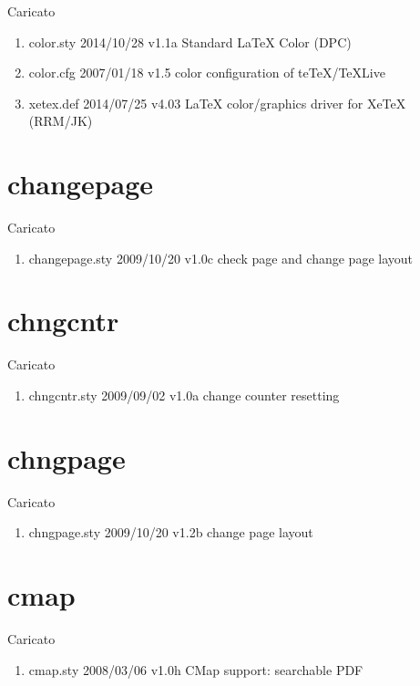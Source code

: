 Caricato 
\begin{enumerate}
	 \item color.sty    2014/10/28 v1.1a Standard LaTeX Color (DPC)
	 \item color.cfg    2007/01/18 v1.5 color configuration of teTeX/TeXLive
	 \item xetex.def    2014/07/25 v4.03 LaTeX color/graphics driver for XeTeX (RRM/JK)
\end{enumerate}

\section{changepage}

Caricato 
\begin{enumerate}
\item changepage.sty 2009/10/20 v1.0c check page and change page layout
\end{enumerate}
\section{chngcntr}

Caricato 
\begin{enumerate}
\item chngcntr.sty 2009/09/02 v1.0a change counter resetting
\end{enumerate}
\section{chngpage}

Caricato 
\begin{enumerate}
\item chngpage.sty 2009/10/20 v1.2b change page layout
\end{enumerate}
\section{cmap}

Caricato 
\begin{enumerate}
\item cmap.sty 2008/03/06 v1.0h CMap support: searchable PDF
\end{enumerate}
\lstset{language=[LaTeX]TeX} 
